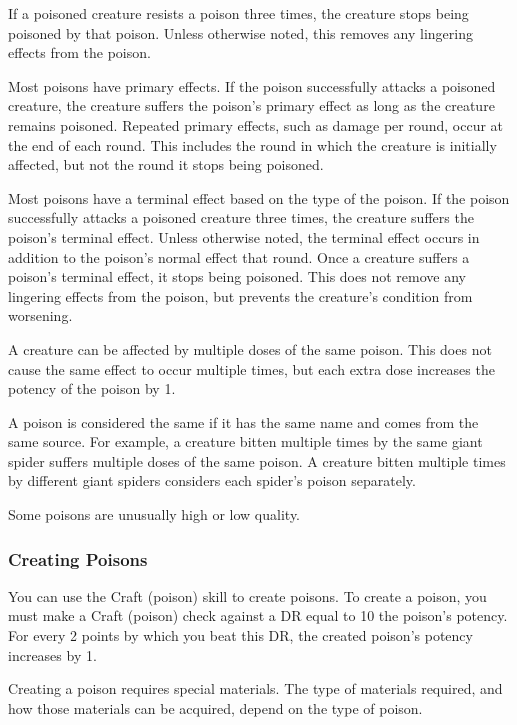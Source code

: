 If a poisoned creature resists a poison three times, the creature stops being poisoned by that poison.
Unless otherwise noted, this removes any lingering effects from the poison.

Most poisons have primary effects.
If the poison successfully attacks a poisoned creature, the creature suffers the poison's primary effect as long as the creature remains poisoned.
Repeated primary effects, such as damage per round, occur at the end of each round.
This includes the round in which the creature is initially affected, but not the round it stops being poisoned.

Most poisons have a terminal effect based on the type of the poison.
If the poison successfully attacks a poisoned creature three times, the creature suffers the poison's terminal effect.
Unless otherwise noted, the terminal effect occurs in addition to the poison's normal effect that round.
Once a creature suffers a poison's terminal effect, it stops being poisoned.
This does not remove any lingering effects from the poison, but prevents the creature's condition from worsening.

A creature can be affected by multiple doses of the same poison.
This does not cause the same effect to occur multiple times, but each extra dose increases the potency of the poison by 1.

A poison is considered the same if it has the same name and comes from the same source.
For example, a creature bitten multiple times by the same giant spider suffers multiple doses of the same poison.
A creature bitten multiple times by different giant spiders considers each spider's poison separately.

 Some poisons are unusually high or low quality.

\subsubsection{Creating Poisons}\label{Creating Poisons}

You can use the Craft (poison) skill to create poisons.
To create a poison, you must make a Craft (poison) check against a DR equal to 10 \add the poison's potency.
For every 2 points by which you beat this DR, the created poison's potency increases by 1.

Creating a poison requires special materials.
The type of materials required, and how those materials can be acquired, depend on the type of poison.

